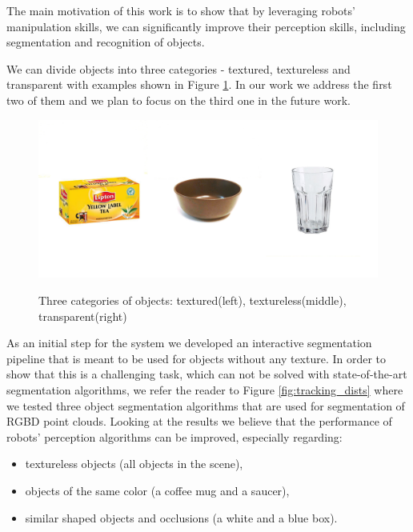  The main
motivation of this work is to show that by leveraging robots' manipulation skills, we can significantly improve their perception skills, including segmentation and recognition of objects.
	

	
	
We can divide objects into three categories - textured, textureless and transparent with examples shown in Figure \ref{fig:all-objects}. In our work we address the first two of them and we plan to focus on the third one in the future work.

\begin{figure}

{\includegraphics[width=1\columnwidth]{figures/all-objects.jpg}}

\caption{Three categories of objects: textured(left), textureless(middle), transparent(right)}
\label{fig:all-objects}
\end{figure}

As an initial step for the system we developed an interactive segmentation pipeline that is meant to be used for objects without any texture. In order to show that this is a challenging task, which can not be solved with state-of-the-art segmentation algorithms, we refer the reader to Figure \ref{fig:tracking_dists} where we tested three object segmentation algorithms that are used for segmentation of RGBD point clouds. Looking at the results we believe that the performance of robots' perception algorithms can be improved, especially regarding: 

\begin{itemize} 
\item textureless objects (all objects in the scene),
\item objects of the same color (a coffee mug and a saucer),
\item similar shaped objects and occlusions (a white and a blue box).
\end{itemize}


